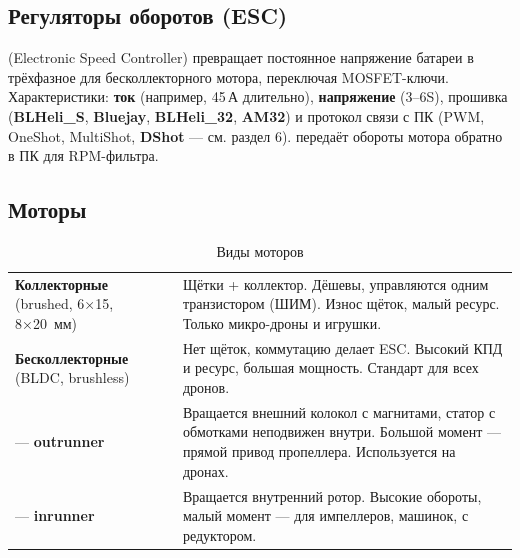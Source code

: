 
\subsection{Регуляторы оборотов (ESC)}
 (Electronic Speed Controller) превращает постоянное напряжение батареи в трёхфазное для бесколлекторного мотора, переключая MOSFET-ключи. Характеристики: \textbf{ток} (например, 45\,А длительно), \textbf{напряжение} (3–6S), прошивка (\textbf{BLHeli\_S}, \textbf{Bluejay}, \textbf{BLHeli\_32}, \textbf{AM32}) и протокол связи с ПК (PWM, OneShot, MultiShot, \textbf{DShot} — см. раздел 6).  передаёт обороты мотора обратно в ПК для RPM-фильтра.

\subsection{Моторы}
\begin{table}[H]\centering\small
\renewcommand{\arraystretch}{1.3}
\begin{tabularx}{\linewidth}{@{}p{34mm} X@{}}
\toprule
\textbf{Коллекторные} (brushed, 6×15, 8×20~мм) & Щётки + коллектор. Дёшевы, управляются одним транзистором (ШИМ). Износ щёток, малый ресурс. Только микро-дроны и игрушки. \\
\textbf{Бесколлекторные} (BLDC, brushless) & Нет щёток, коммутацию делает ESC. Высокий КПД и ресурс, большая мощность. Стандарт для всех дронов. \\
\quad — \textbf{outrunner} & Вращается внешний колокол с магнитами, статор с обмотками неподвижен внутри. Большой момент — прямой привод пропеллера. Используется на дронах. \\
\quad — \textbf{inrunner} & Вращается внутренний ротор. Высокие обороты, малый момент — для импеллеров, машинок, с редуктором. \\
\bottomrule
\end{tabularx}
\caption{Виды моторов}
\end{table}

